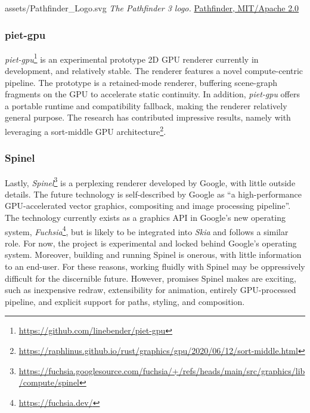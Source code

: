 \smallsvg
{assets/Pathfinder_Logo.svg}
{\textit{The Pathfinder 3 logo.}}
{\href{https://github.com/servo/pathfinder}{Pathfinder, MIT/Apache 2.0}}
\medskip

\subsubsection{piet-gpu}\label{sec:piet-gpu}
\textit{piet-gpu}\footnote{\href{https://github.com/linebender/piet-gpu}{https://github.com/linebender/piet-gpu}} is an experimental prototype 2D GPU renderer currently in development, and relatively stable. The renderer features a novel compute-centric pipeline. The prototype is a retained-mode renderer, buffering scene-graph fragments on the GPU to accelerate static continuity. In addition, \textit{piet-gpu} offers a portable runtime and compatibility fallback, making the renderer relatively general purpose. The research has contributed impressive results, namely with leveraging a sort-middle GPU architecture\footnote{\href{https://raphlinus.github.io/rust/graphics/gpu/2020/06/12/sort-middle.html}{https://raphlinus.github.io/rust/graphics/gpu/2020/06/12/sort-middle.html}}.

\subsubsection{Spinel}\label{sec:spinel}

Lastly, \textit{Spinel}\footnote{\href{https://fuchsia.googlesource.com/fuchsia/+/refs/heads/main/src/graphics/lib/compute/spinel}{https://fuchsia.googlesource.com/fuchsia/+/refs/heads/main/src/graphics/lib/compute/spinel}} is a perplexing renderer developed by Google, with little outside details. The future technology is self-described by Google as ``a high-performance GPU-accelerated vector graphics, compositing and image processing pipeline''\cite{Spinel}. The technology currently exists as a graphics API in Google's new operating system, \textit{Fuchsia}\footnote{\href{https://fuchsia.dev/}{https://fuchsia.dev/}}, but is likely to be integrated into \textit{Skia} and follows a similar role. For now, the project is experimental and locked behind Google's operating system. Moreover, building and running Spinel is onerous, with little information to an end-user. For these reasons, working fluidly with Spinel may be oppressively difficult for the discernible future. However, promises Spinel makes are exciting, such as inexpensive redraw, extensibility for animation, entirely GPU-processed pipeline, and explicit support for paths, styling, and composition\cite{Spinel_Features}.

